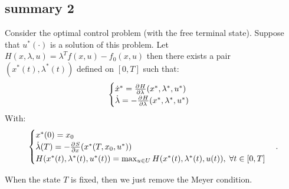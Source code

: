 \subsection{summary 2}
Consider the optimal control problem (with the free terminal state). Suppose that $u^{*}(\cdot)$ is a solution of this problem.
Let $H(x,\lambda,u) = \lambda^{T}f(x,u) - f_0(x,u) $ then there exists a pair $(x^{*}(t),\lambda^{*}(t))$ defined on $[0,T]$ such that:
\begin{equation}
    \begin{cases}
        \dot{x}^{*} = \frac{\partial^{}H}{\partial\lambda^{}}(x^{*},\lambda^{*},u^{*})\\
        \dot{\lambda} = - \frac{\partial^{}H}{\partial\lambda^{}}(x^{*},\lambda^{*},u^{*})
    \end{cases}
\end{equation}
With:
\[
\begin{cases}
    x^{*}(0) = x_0\\
    \dot{\lambda}(T) = - \frac{\partial^{}S}{\partial x^{}}(x^{*}(T,x_0,u^{*}))\\
    H(x^{*}(t),\lambda^{*}(t),u^{*}(t)) = \max_{u \in U} H(x^{*}(t),\lambda^{*}(t),u(t)),\; \forall t \in [0,T] 
\end{cases}
.\] 


When the state $T$ is fixed, then we just remove the Meyer condition.
